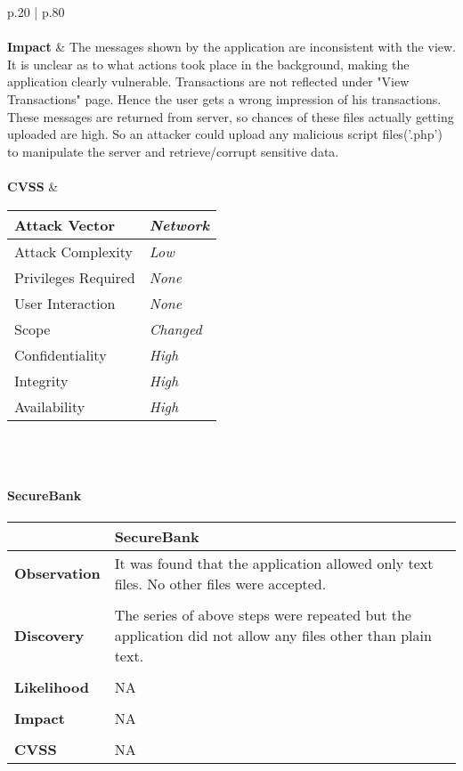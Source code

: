\begin{longtable*}{p{.20\textwidth} | p{.80\textwidth}}
    \\\\
    \textbf{Impact} &
        The messages shown by the application are inconsistent with the view. It is unclear as to what actions took place in the background, making the application clearly vulnerable. Transactions are not reflected under "View Transactions" page. Hence the user gets a wrong impression of his transactions. These messages are returned from server, so chances of these files actually getting uploaded are high. So an attacker could upload any malicious script files('.php') to manipulate the server and retrieve/corrupt sensitive data.
    \\\\
    \textbf{CVSS} &
       \begin{tabular}{| l | l |}
             \hline
             Attack Vector		& \textit{Network}\\
             \hline
             Attack Complexity	& \textit{Low} \\
             \hline
             Privileges Required & \textit{None} \\
             \hline
             User Interaction	& \textit{None} \\
             \hline
             Scope		& \textit{Changed} \\
             \hline
             Confidentiality	& \textit{High} \\
             \hline
             Integrity		& \textit{High} \\
             \hline
             Availability		& \textit{High} \\
             \hline
             \end{tabular}
           \\
    \\
    \hline
\end{longtable*}
\paragraph{SecureBank} \mbox{}
\begin{longtable*}{p{.20\textwidth} | p{.80\textwidth}}
    \hline
    & \textbf{SecureBank} \\
    \hline
    \textbf{Observation} &
        It was found that the application allowed only text files. No other files were accepted.
    \\\\
    \textbf{Discovery} &
	    The series of above steps were repeated but the application did not allow any files other than plain text.
    \\\\
    \textbf{Likelihood} &
        NA
    \\\\
    \textbf{Impact} &
		NA
    \\\\
    \textbf{CVSS} &
        NA
    \\
    \hline
\end{longtable*}
\clearpage